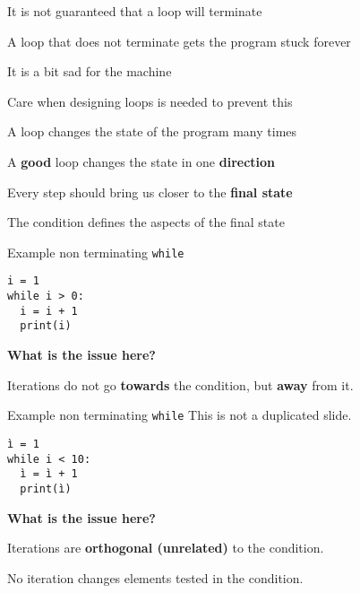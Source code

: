 \documentclass{beamer}
\begin{document}
\begin{slide}{
\item It is not guaranteed that a loop will terminate
\item A loop that does not terminate gets the program stuck forever
\item It is a bit sad for the machine
\item Care when designing loops is needed to prevent this
}\end{slide}

\begin{slide}{
\item A loop changes the state of the program many times
\item A \textbf{good} loop changes the state in one \textbf{direction}
\item Every step should bring us closer to the \textbf{final state}
\item The condition defines the aspects of the final state
}\end{slide}

\begin{frame}[fragile]{Example non terminating \texttt{while}}
\begin{lstlisting}[frame=shadowbox,basicstyle=\ttfamily\tiny]
i = 1
while i > 0:
  i = i + 1
  print(i)
\end{lstlisting}

\textbf{What is the issue here?}

\pause

Iterations do not go \textbf{towards} the condition, but \textbf{away} from it.

\end{frame}

\begin{frame}[fragile]{Example non terminating \texttt{while}}
This is not a duplicated slide.

\begin{lstlisting}[frame=shadowbox,basicstyle=\ttfamily\tiny]
ì = 1
while i < 10:
  ì = ì + 1
  print(ì)
\end{lstlisting}

\textbf{What is the issue here?}

\pause

Iterations are \textbf{orthogonal (unrelated)} to the condition.

No iteration changes elements tested in the condition.
\end{frame}
\end{document}
